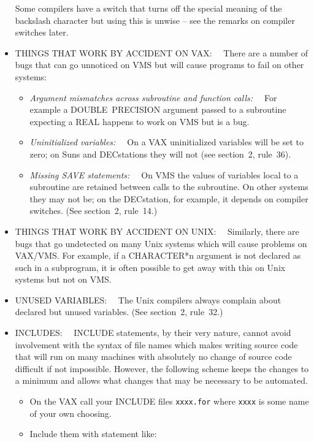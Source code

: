\documentclass[twoside,11pt]{article}
\renewcommand{\_}{{\tt\char'137}}
\begin{document}
\begin{itemize}
  Some compilers have a switch that turns off the special meaning of the
  backslash character but using this is unwise -- see the remarks
  on compiler switches later.
 \item THINGS THAT WORK BY ACCIDENT ON VAX:~~
  There are a number of bugs that can go unnoticed on VMS but will cause
  programs to fail on other systems:
  \begin{itemize}
   \item {\it Argument mismatches across subroutine and function calls:~~}
    For example a DOUBLE~PRECISION argument passed to a subroutine
    expecting a REAL happens to work on VMS but is a bug.
   \item {\it Uninitialized variables:~~}
    On a VAX uninitialized variables will be set to zero;  on Suns and
    DECstations they will not (see section~2, rule~36).
   \item {\it Missing SAVE statements:~~}
    On VMS the values of variables local to a subroutine are retained
    between calls to the subroutine.  On other systems they may not be;
    on the DECstation, for example, it depends on compiler switches.
    (See section~2, rule~14.)
  \end{itemize}
 \item THINGS THAT WORK BY ACCIDENT ON UNIX:~~
  Similarly, there are bugs that go undetected on many Unix systems
  which will cause problems on VAX/VMS.  For example, if a CHARACTER*n
  argument is not declared as such in a subprogram, it is often
  possible to get away with this on Unix systems but not on VMS.
 \item UNUSED VARIABLES:~~
  The Unix compilers always complain about declared but unused variables.
  (See section~2, rule~32.)
 \item INCLUDES:~~
  INCLUDE statements, by their very nature, cannot avoid involvement with
  the syntax of file names which makes writing source code that will run
  on many machines with absolutely no change of source code difficult if
  not impossible. However, the following scheme keeps the changes to a
  minimum and allows what changes that may be necessary to be automated.
  \begin{itemize}
   \item On the VAX call your INCLUDE files \verb|xxxx.for| where
    \verb|xxxx| is some name of your own choosing.
   \item Include them with statement like:
    \begin{quote}
    \begin{verbatim}

\end{verbatim}
\end{quote}
\end{itemize}
\end{itemize}
\end{document}
